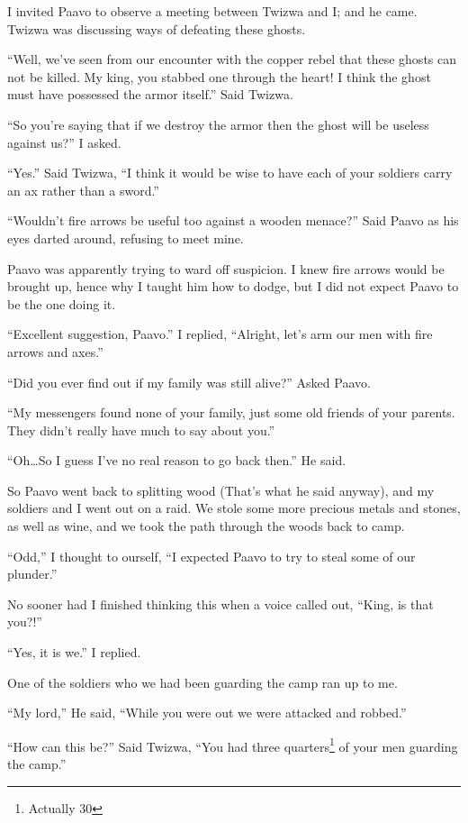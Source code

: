 \tbreak

I invited Paavo to observe a meeting between Twizwa and I; and he came. Twizwa was discussing ways of defeating these ghosts.

``Well, we've seen from our encounter with the copper rebel that these ghosts can not be killed. My king, you stabbed one through the heart! I think the ghost must have possessed the armor itself.'' Said Twizwa.

``So you're saying that if we destroy the armor then the ghost will be useless against us?'' I asked.

``Yes.'' Said Twizwa, ``I think it would be wise to have each of your soldiers carry an ax rather than a sword.''

``Wouldn't fire arrows be useful too against a wooden menace?'' Said Paavo as his eyes darted around, refusing to meet mine.

Paavo was apparently trying to ward off suspicion. I knew fire arrows would be brought up, hence why I taught him how to dodge, but I did not expect Paavo to be the one doing it.

``Excellent suggestion, Paavo.'' I replied, ``Alright, let's arm our men with fire arrows and axes.''

``Did you ever find out if my family was still alive?'' Asked Paavo.

``My messengers found none of your family, just some old friends of your parents. They didn't really have much to say about you.''

``Oh\ldots So I guess I've no real reason to go back then.'' He said.

So Paavo went back to splitting wood (That's what he said anyway), and my soldiers and I went out on a raid.
We stole some more precious metals and stones, as well as wine, and we took the path through the woods back to camp.

``Odd,'' I thought to ourself, ``I expected Paavo to try to steal some of our plunder.''

No sooner had I finished thinking this when a voice called out, ``King, is that you?!''

``Yes, it is we.'' I replied.

One of the soldiers who we had been guarding the camp ran up to me.

``My lord,'' He said, ``While you were out we were attacked and robbed.''

``How can this be?'' Said Twizwa, ``You had three quarters\footnote{Actually 30} of your men guarding the camp.''

